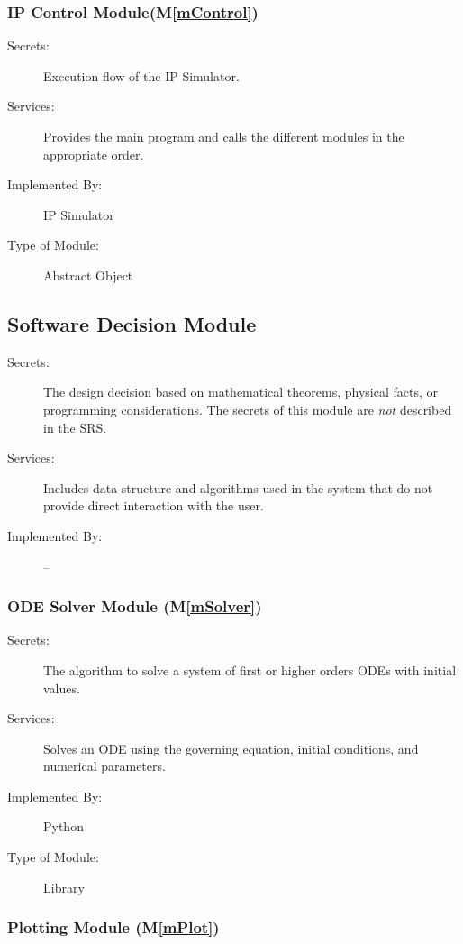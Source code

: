 \documentclass[12pt, titlepage]{article}
\newcommand{\mref}[1]{M\ref{#1}}
\begin{document}
\subsubsection{IP Control Module(\mref{mControl})}

\begin{description}
\item[Secrets:] Execution flow of the IP Simulator. 
\item[Services:] Provides the main program and calls the different modules in the appropriate order.
\item[Implemented By:] IP Simulator
\item[Type of Module:] Abstract Object
\end{description} 


\subsection{Software Decision Module}

\begin{description}
\item[Secrets:] The design decision based on mathematical theorems, physical facts, or programming considerations. The secrets of this module are \emph{not} described in the SRS.
\item[Services:] Includes data structure and algorithms used in the system that do not provide direct interaction with the user. 
\item[Implemented By:] --
\end{description}
\subsubsection{ODE Solver Module (\mref{mSolver})}

\begin{description}
\item[Secrets:] The algorithm to solve a system of first or higher orders ODEs with initial values.
\item[Services:] Solves an ODE using the governing equation, initial conditions, and numerical parameters.
\item[Implemented By:] Python
\item[Type of Module:] Library
\end{description}

\subsubsection{Plotting Module (\mref{mPlot})}
\end{document}
